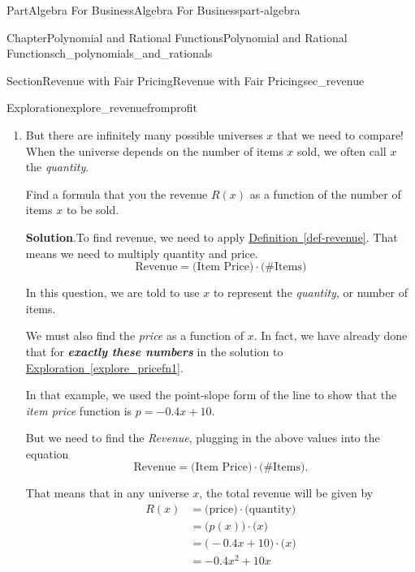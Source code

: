 \documentclass[oneside,10pt,]{tufte-book}
\newcommand{\blocktitlefont}{\relax}
\newcommand{\xreffont}{\relax}
\newcommand{\alert}[1]{\textbf{\textit{#1}}}
\numberwithin{equation}{chapter}
\begin{document}
\begin{partptx}{Part}{Algebra For Business}{}{Algebra For Business}{}{}{part-algebra}
\begin{chapterptx}{Chapter}{Polynomial and Rational Functions}{}{Polynomial and Rational Functions}{}{}{ch_polynomials_and_rationals}
\begin{sectionptx}{Section}{Revenue with Fair Pricing}{}{Revenue with Fair Pricing}{}{}{sec_revenue}
\begin{exploration}{Exploration}{}{explore_revenuefromprofit}
\begin{enumerate}[font=\bfseries,label=(\alph*),ref=\alph*]
\par
In the scenario where we sell 20 items at 2\textdollar{}\slash{}item, our total revenue will be \(R(20) = 20\cdot 2 = 40\$\).%
\item{}But there are infinitely many possible universes \(x\) that we need to compare! When the universe depends on the number of items \(x\) sold, we often call \(x\) the \emph{quantity}.%
\par
Find a formula that you the revenue \(R(x)\) as a function of the number of items \(x\) to be sold.%
\par\smallskip%
\noindent\textbf{\blocktitlefont Solution}.\hypertarget{explore_revenuefromprofit-4-2}{}\quad{}To find revenue, we need to apply \hyperref[def-revenue]{Definition~{\xreffont\ref{def-revenue}}}.  That means we need to multiply quantity and price.%
\begin{equation*}
\text{Revenue} = \Big(\text{Item Price}\Big) \cdot \Big(\text{\# Items}\Big)
\end{equation*}
%
\par
In this question, we are told to use \(x\) to represent the \emph{quantity}, or number of items.%
\par
We must also find the \emph{price} as a function of \(x\). In fact, we have already done that for \alert{exactly these numbers} in the solution to \hyperref[explore_pricefn1]{Exploration~{\xreffont\ref{explore_pricefn1}}}.%
\par
In that example, we used the point-slope form of the line to show that the \emph{item price} function is  \(p = -0.4 x + 10\).%
\par
But we need to find the \emph{Revenue}, plugging in the above values into the equation%
\begin{equation*}
\text{Revenue} = \Big(\text{Item Price}\Big) \cdot \Big(\text{\# Items}\Big)\text{.}
\end{equation*}
%
\par
That means that in any universe \(x\), the total revenue will be given by%
\begin{equation*}
\begin{aligned}
R(x)  &=  \Big(\text{price}\Big) \cdot \Big(\text{quantity}\Big) \\
&=  \Big(p(x) \Big) \cdot \Big(x\Big) \\
&=  \Big(-0.4 x + 10\Big)\cdot \Big(x\Big) \\ 
&=  -0.4x^2 + 10x\end{aligned}
\end{equation*}

\end{enumerate}
\end{exploration}
\end{sectionptx}
\end{chapterptx}
\end{partptx}
\end{document}
